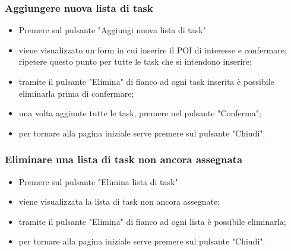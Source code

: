 \subsubsection{Aggiungere nuova lista di task}
\begin{itemize}
    \item Premere sul pulsante "Aggiungi nuova lista di task"
    \item viene visualizzato un form in cui inserire il POI di interesse e confermare; ripetere questo punto per tutte le task che si intendono inserire;
    \item tramite il pulsante "Elimina" di fianco ad ogni task inserita è possibile eliminarla prima di confermare;
    \item una volta aggiunte tutte le task, premere nel pulsante "Conferma";
    \item per tornare alla pagina iniziale serve premere sul pulsante "Chiudi".
\end{itemize}
\subsubsection{Eliminare una lista di task non ancora assegnata}
\begin{itemize}
    \item Premere sul pulsante "Elimina lista di task"
    \item viene visualizzata la lista di task non ancora assegnate;
    \item tramite il pulsante "Elimina" di fianco ad ogni lista è possibile eliminarla;
    \item per tornare alla pagina iniziale serve premere sul pulsante "Chiudi".
\end{itemize}